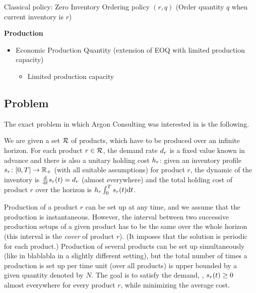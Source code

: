 Classical policy: Zero Inventory Ordering policy $(r,q)$ (Order quantity $q$ when current inventory is $r$)

\medskip

\textbf{Production}

\begin{itemize}
  \item Economic Production Quantity (extension of EOQ with limited production capacity) \cite{Taft1918}
  \begin{itemize}
    \item Limited production capacity
  \end{itemize}
\end{itemize}


\medskip


\medskip


\subsection{Problem}

\label{sec:prob-cont-rev}

The exact problem in which Argon Consulting was interested in is the following.

We are given a set $\mathcal{R}$ of products, which have to be produced over an infinite horizon. For each product $r\in\mathcal{R}$, the demand rate $d_r$ is a fixed value known in advance and there is also a unitary holding cost $h_r$: given an inventory profile $s_r\colon[0,T]\rightarrow\mathbb{R}_+$ (with all suitable assumptions) for product $r$, the dynamic of the inventory is $\frac{\mathrm{d}}{\mathrm{d} t}s_r(t)=d_r$ (almost everywhere) and the total holding cost of product $r$ over the horizon is $h_r\int_0^{T}s_r(t)\mathrm{d} t$.

Production of a product $r$ can be set up at any time, and we assume that the production is instantaneous. However, the interval between two successive production setups of a given product has to be the same over the whole horizon (this interval is the {\em cover} of product $r$). (It imposes that the solution is periodic for each product.) Production of several products can be set up simultaneously (like in blablabla in a slightly different setting), but the total number of times a production is set up per time unit (over all products) is upper bounded by a given quantity denoted by $N$. The goal is to satisfy the demand, \ie, $s_r(t)\geq 0$ almost everywhere for every product $r$, while minimizing the average cost.

